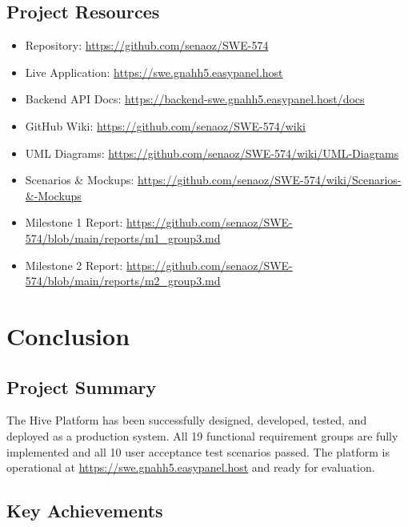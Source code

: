 \documentclass[10pt,a4paper]{report}
\begin{document}
\section{Project Resources}

\begin{itemize}
    \item Repository: \url{https://github.com/senaoz/SWE-574}
    \item Live Application: \url{https://swe.gnahh5.easypanel.host}
    \item Backend API Docs: \url{https://backend-swe.gnahh5.easypanel.host/docs}
    \item GitHub Wiki: \url{https://github.com/senaoz/SWE-574/wiki}
    \item UML Diagrams: \url{https://github.com/senaoz/SWE-574/wiki/UML-Diagrams}
    \item Scenarios \& Mockups: \url{https://github.com/senaoz/SWE-574/wiki/Scenarios-\&-Mockups}
    \item Milestone 1 Report: \url{https://github.com/senaoz/SWE-574/blob/main/reports/m1\_group3.md}
    \item Milestone 2 Report: \url{https://github.com/senaoz/SWE-574/blob/main/reports/m2\_group3.md}
\end{itemize}

\chapter{Conclusion}

\section{Project Summary}

The Hive Platform has been successfully designed, developed, tested, and deployed as a production system. All 19 functional requirement groups are fully implemented and all 10 user acceptance test scenarios passed. The platform is operational at \url{https://swe.gnahh5.easypanel.host} and ready for evaluation.

\section{Key Achievements}
\end{document}

